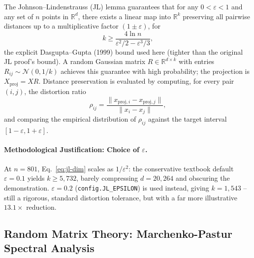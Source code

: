 \documentclass[11pt]{article}
\begin{document}
The Johnson--Lindenstrauss (JL) lemma guarantees that for any
$0 < \varepsilon < 1$ and any set of $n$ points in $\mathbb{R}^d$, there
exists a linear map into $\mathbb{R}^k$ preserving all pairwise distances
up to a multiplicative factor $(1 \pm \varepsilon)$, for
\begin{equation}
k \geq \frac{4 \ln n}{\varepsilon^2/2 - \varepsilon^3/3},
\label{eq:jl-dim}
\end{equation}
the explicit Dasgupta--Gupta (1999) bound used here (tighter than the
original JL proof's bound). A random Gaussian matrix
$R \in \mathbb{R}^{d \times k}$ with entries $R_{ij} \sim \mathcal{N}(0, 1/k)$
achieves this guarantee with high probability; the projection is
$X_{\text{proj}} = X R$. Distance preservation is evaluated by computing,
for every pair $(i, j)$, the distortion ratio
\begin{equation}
\rho_{ij} = \frac{\lVert x_{\text{proj},i} - x_{\text{proj},j} \rVert}{\lVert x_i - x_j \rVert},
\label{eq:jl-distortion}
\end{equation}
and comparing the empirical distribution of $\rho_{ij}$ against the target
interval $[1-\varepsilon, 1+\varepsilon]$.

\paragraph{Methodological Justification: Choice of $\varepsilon$.} At
$n = 801$, Eq.~\ref{eq:jl-dim} scales as $1/\varepsilon^2$: the
conservative textbook default $\varepsilon = 0.1$ yields
$k \geq 5{,}732$, barely compressing $d = 20{,}264$ and obscuring the
demonstration. $\varepsilon = 0.2$ (\texttt{config.JL\_EPSILON}) is used
instead, giving $k = 1{,}543$ -- still a rigorous, standard distortion
tolerance, but with a far more illustrative $13.1\times$ reduction.

\subsection{Random Matrix Theory: Marchenko-Pastur Spectral Analysis}
\end{document}
